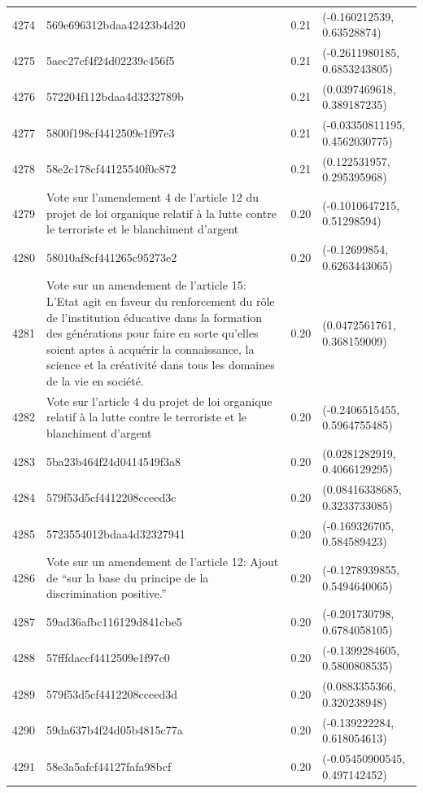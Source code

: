\begin{table}[ht]
\begin{tabular}{rlrl}
  4274 & 569e696312bdaa42423b4d20 & 0.21 & (-0.160212539, 0.63528874) \\ 
  4275 & 5aec27cf4f24d02239c456f5 & 0.21 & (-0.2611980185, 0.6853243805) \\ 
  4276 & 572204f112bdaa4d3232789b & 0.21 & (0.0397469618, 0.389187235) \\ 
  4277 & 5800f198cf4412509e1f97e3 & 0.21 & (-0.03350811195, 0.4562030775) \\ 
  4278 & 58e2c178cf44125540f0c872 & 0.21 & (0.122531957, 0.295395968) \\ 
  4279 & Vote sur l'amendement 4 de l'article 12 du projet de loi organique relatif à la lutte contre le terroriste et le blanchiment d'argent & 0.20 & (-0.1010647215, 0.51298594) \\ 
  4280 & 58010af8cf441265c95273e2 & 0.20 & (-0.12699854, 0.6263443065) \\ 
  4281 & Vote sur un amendement de l'article 15: L’Etat agit en faveur du renforcement du rôle de l’institution éducative dans la formation des générations pour faire en sorte qu’elles soient aptes à acquérir la connaissance, la science et la créativité dans tous les domaines de la vie en société. & 0.20 & (0.0472561761, 0.368159009) \\ 
  4282 & Vote sur l'article 4 du projet de loi organique relatif à la lutte contre le terroriste et le blanchiment d'argent & 0.20 & (-0.2406515455, 0.5964755485) \\ 
  4283 & 5ba23b464f24d0414549f3a8 & 0.20 & (0.0281282919, 0.4066129295) \\ 
  4284 & 579f53d5cf4412208cceed3c & 0.20 & (0.08416338685, 0.3233733085) \\ 
  4285 & 5723554012bdaa4d32327941 & 0.20 & (-0.169326705, 0.584589423) \\ 
  4286 & Vote sur un amendement de l'article 12: Ajout de “sur la base du principe de la discrimination positive.” & 0.20 & (-0.1278939855, 0.5494640065) \\ 
  4287 & 59ad36afbc116129d841cbe5 & 0.20 & (-0.201730798, 0.6784058105) \\ 
  4288 & 57fffdaccf4412509e1f97c0 & 0.20 & (-0.1399284605, 0.5800808535) \\ 
  4289 & 579f53d5cf4412208cceed3d & 0.20 & (0.0883355366, 0.320238948) \\ 
  4290 & 59da637b4f24d05b4815c77a & 0.20 & (-0.139222284, 0.618054613) \\ 
  4291 & 58e3a5afcf44127fafa98bcf & 0.20 & (-0.05450900545, 0.497142452) \\ 

\end{tabular}
\end{table}
